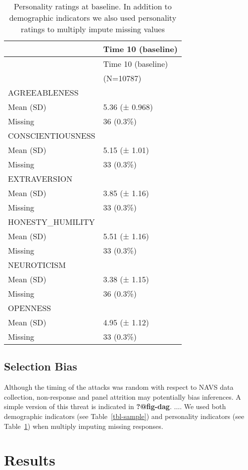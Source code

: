 \documentclass[
  singlecolumn]{report}
\begin{document}
\hypertarget{tbl-personality}{}
\begin{longtable}[]{@{}ll@{}}
\caption{\label{tbl-personality}Personality ratings at baseline. In
addition to demographic indicators we also used personality ratings to
multiply impute missing values}\tabularnewline
\toprule()
& Time 10 (baseline) \\
\midrule()
\endfirsthead
\toprule()
& Time 10 (baseline) \\
\midrule()
\endhead
& (N=10787) \\
AGREEABLENESS & \\
Mean (SD) & 5.36 (± 0.968) \\
Missing & 36 (0.3\%) \\
CONSCIENTIOUSNESS & \\
Mean (SD) & 5.15 (± 1.01) \\
Missing & 33 (0.3\%) \\
EXTRAVERSION & \\
Mean (SD) & 3.85 (± 1.16) \\
Missing & 33 (0.3\%) \\
HONESTY\_HUMILITY & \\
Mean (SD) & 5.51 (± 1.16) \\
Missing & 33 (0.3\%) \\
NEUROTICISM & \\
Mean (SD) & 3.38 (± 1.15) \\
Missing & 36 (0.3\%) \\
OPENNESS & \\
Mean (SD) & 4.95 (± 1.12) \\
Missing & 33 (0.3\%) \\
\bottomrule()
\end{longtable}

\hypertarget{selection-bias}{%
\subsection{Selection Bias}\label{selection-bias}}

Although the timing of the attacks was random with respect to NAVS data
collection, non-response and panel attrition may potentially bias
inferences. A simple version of this threat is indicated in
\textbf{?@fig-dag}. \(\dots\). We used both demographic indicators (see
Table~\ref{tbl-sample}) and personality indicators (see
Table~\ref{tbl-personality}) when multiply imputing missing responses.

\hypertarget{results}{%
\section{Results}\label{results}}
\end{document}
